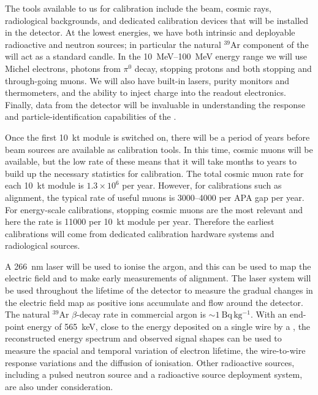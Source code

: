 The tools available to us for calibration include the  beam, cosmic rays, radiological backgrounds, and dedicated calibration devices that will be installed in the detector. At the lowest energies, we have both intrinsic and deployable radioactive and neutron sources; in particular the natural $^{39}$Ar component of the  will act as a standard candle. In the \SIrange{10}{100}{\mega\electronvolt} energy range we will use Michel electrons, photons from $\pi^{0}$ decay, stopping protons and both stopping and through-going muons. We will also have built-in lasers, purity monitors and thermometers, and the ability to inject charge into the readout electronics. Finally, data from the  detector will be invaluable in understanding the response and particle-identification capabilities of the .

Once the first \SI{10}{\kilo\tonne} module is switched on, there will be a period of years before  beam sources are available as calibration tools. In this time, cosmic muons will be available, but the low rate of these means that it will take months to years to build up the necessary statistics for calibration. The total cosmic muon rate for each \SI{10}{\kilo\tonne} module is $1.3\times 10^{6}$ per year. However, for calibrations such as  alignment, the typical rate of useful muons is 3000--4000 per APA gap per year. For energy-scale calibrations, stopping cosmic muons are the most relevant and here the rate is 11000 per \SI{10}{\kilo\tonne} module per year. Therefore the earliest calibrations will come from dedicated calibration hardware systems and radiological sources.

A \SI{266}{\nano\meter} laser will be used to ionise the argon, and this can be used to map the electric field and to make early measurements of  alignment. The laser system will be used throughout the lifetime of the detector to measure the gradual changes in the electric field map as positive ions accumulate and flow around the detector. The natural $^{39}$Ar $\beta$-decay rate in commercial argon is $\sim\!\SI{1}{\becquerel\,\kilo\gram^{-1}}$. With an end-point energy of \SI{565}{\kilo\electronvolt}, close to the energy deposited on a single wire by a , the reconstructed energy spectrum and observed signal shapes can be used to measure the spacial and temporal variation of electron lifetime, the wire-to-wire response variations and the diffusion of ionisation. Other radioactive sources, including a pulsed neutron source and a radioactive source deployment system, are also under consideration.

